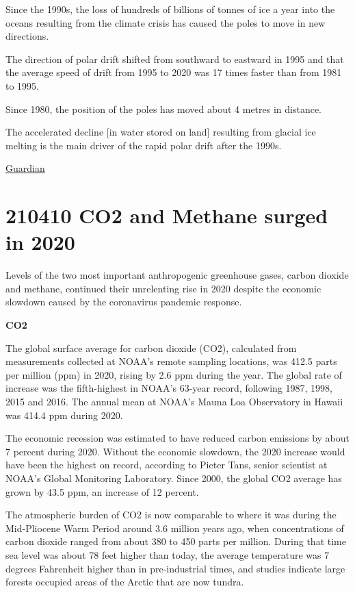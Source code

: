 \documentclass[
]{book}
\begin{document}
Since the 1990s, the loss of hundreds of billions of tonnes of ice a year into the oceans resulting from the climate crisis has caused the poles to move in new directions.

The direction of polar drift shifted from southward to eastward in 1995 and that the average speed of drift from 1995 to 2020 was 17 times faster than from 1981 to 1995.

Since 1980, the position of the poles has moved about 4 metres in distance.

The accelerated decline {[}in water stored on land{]} resulting from glacial ice melting is the main driver of the rapid polar drift after the 1990s.

\href{https://www.theguardian.com/environment/2021/apr/23/climate-crisis-has-shifted-the-earths-axis-study-shows}{Guardian}

\hypertarget{co2-and-methane-surged-in-2020}{%
\section{210410 CO2 and Methane surged in 2020}\label{co2-and-methane-surged-in-2020}}

Levels of the two most important anthropogenic greenhouse gases, carbon dioxide and methane, continued their unrelenting rise in 2020 despite the economic slowdown caused by the coronavirus pandemic response.

\textbf{CO2}

The global surface average for carbon dioxide (CO2), calculated from measurements collected at NOAA's remote sampling locations, was 412.5 parts per million (ppm) in 2020, rising by 2.6 ppm during the year. The global rate of increase was the fifth-highest in NOAA's 63-year record, following 1987, 1998, 2015 and 2016. The annual mean at NOAA's Mauna Loa Observatory in Hawaii was 414.4 ppm during 2020.

The economic recession was estimated to have reduced carbon emissions by about 7 percent during 2020. Without the economic slowdown, the 2020 increase would have been the highest on record, according to Pieter Tans, senior scientist at NOAA's Global Monitoring Laboratory. Since 2000, the global CO2 average has grown by 43.5 ppm, an increase of 12 percent.

The atmospheric burden of CO2 is now comparable to where it was during the Mid-Pliocene Warm Period around 3.6 million years ago, when concentrations of carbon dioxide ranged from about 380 to 450 parts per million. During that time sea level was about 78 feet higher than today, the average temperature was 7 degrees Fahrenheit higher than in pre-industrial times, and studies indicate large forests occupied areas of the Arctic that are now tundra.
\end{document}
